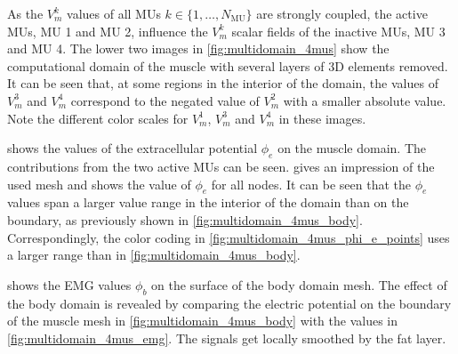 As the $V_m^k$ values of all MUs $k\in \{1,\dots,N_\text{MU}\}$ are strongly coupled, the active MUs, MU 1 and MU 2, influence the $V_m^k$ scalar fields of the inactive MUs, MU 3 and MU 4. The lower two images in \cref{fig:multidomain_4mus} show the computational domain of the muscle with several layers of 3D elements removed. 
It can be seen that, at some regions in the interior of the domain, the values of $V_m^3$ and $V_m^4$ correspond to the negated value of $V_m^2$ with a smaller absolute value. Note the different color scales for $V_m^1$, $V_m^3$ and $V_m^4$ in these images.

 shows the values of the extracellular potential $\phi_e$ on the muscle domain. The contributions from the two active MUs can be seen. 
 gives an impression of the used mesh and shows the value of $\phi_e$ for all nodes. It can be seen that the $\phi_e$ values span a larger value range in the interior of the domain than on the boundary, as previously shown in \cref{fig:multidomain_4mus_body}. Correspondingly, the color coding in \cref{fig:multidomain_4mus_phi_e_points} uses a larger range than in \cref{fig:multidomain_4mus_body}.

 shows the EMG values $\phi_b$ on the surface of the body domain mesh. The effect of the body domain is revealed by comparing the electric potential on the boundary of the muscle mesh in \cref{fig:multidomain_4mus_body} with the values in \cref{fig:multidomain_4mus_emg}. The signals get locally smoothed by the fat layer.


